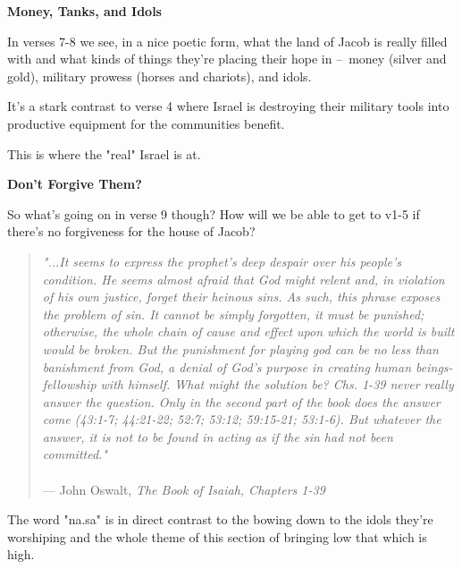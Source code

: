 \documentclass[11pt]{article}
\begin{document}
\vspace{3em}
{\large\bfseries Money, Tanks, and Idols}
\vspace{1em}

In verses 7-8 we see, in a nice poetic form, what the land of Jacob is really filled with
and what kinds of things they're placing their hope in – money (silver and gold), military prowess (horses and chariots), and idols.

{\vspace{1em}}

It's a stark contrast to verse 4 where Israel is destroying their military tools into productive equipment for the communities benefit.

This is where the "real" Israel is at.


\vspace{3em}
{\large\bfseries Don't Forgive Them?}
\vspace{1em}

So what's going on in verse 9 though? How will we be able to get to v1-5 if there's no forgiveness for the house of Jacob?

{\vspace{1em}}

\begin{quote}
\textit{"...It seems to express the prophet's deep despair over his people's condition. He seems almost afraid that God might relent and, in violation of his own justice, forget their heinous sins. As such, this phrase exposes the problem of sin. It cannot be simply forgotten, it must be punished; otherwise, the whole chain of cause and effect upon which the world is built would be broken. But the punishment for playing god can be no less than banishment from God, a denial of God's purpose in creating human beings-fellowship with himself. What might the solution be? Chs. 1-39 never really answer the question. Only in the second part of the book does the answer come (43:1-7; 44:21-22; 52:7; 53:12;
59:15-21; 53:1-6). But whatever the answer, it is not to be found in acting as if the sin had not been committed."}\\\\
\hfill --- John Oswalt, \textit{The Book of Isaiah, Chapters 1-39}
\end{quote}


The word "na.sa" is in direct contrast to the bowing down to the idols they're worshiping and the whole theme of this section of bringing low that which is high.

\begin{thesauce}



\end{thesauce}
\end{document}
